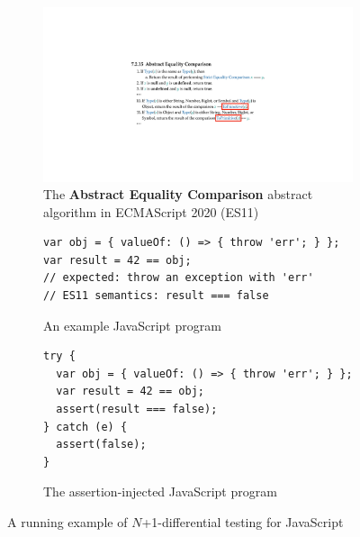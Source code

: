 \begin{figure}[t]
  \centering
  \begin{subfigure}[t]{0.48\textwidth}
    \includegraphics[width=\textwidth]{img/example-algo.pdf}
    \caption{The \textbf{Abstract Equality Comparison} abstract algorithm in
    ECMAScript 2020 (ES11)}
    \label{fig:example-algo}
  \end{subfigure}
  \begin{subfigure}[t]{0.43\textwidth}
    \begin{lstlisting}[style=myJSstyle]
var obj = { valueOf: () => { throw 'err'; } };
var result = 42 == obj;
// expected: throw an exception with 'err'
// ES11 semantics: result === false
    \end{lstlisting}
    \caption{An example JavaScript program}
    \label{fig:example-js}
  \end{subfigure}
  \begin{subfigure}[t]{0.45\textwidth}
    \begin{lstlisting}[style=myJSstyle]
try {
  var obj = { valueOf: () => { throw 'err'; } };
  var result = 42 == obj;
  assert(result === false);
} catch (e) {
  assert(false);
}
    \end{lstlisting}
    \caption{The assertion-injected JavaScript program}
    \label{fig:example-injected}
  \end{subfigure}
  \caption{A running example of $N$+1-differential testing for JavaScript}
  \label{fig:example}
  \vspace*{-1em}
\end{figure}

